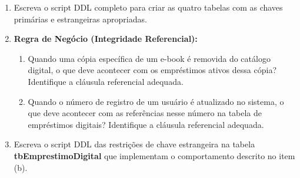 \begin{enumerate}[label=\textbf{\alph*)}]
    \item Escreva o script DDL completo para criar as quatro tabelas com as chaves primárias e estrangeiras apropriadas.
    \resposta{5cm}
    
    \item \textbf{Regra de Negócio (Integridade Referencial):} 
    \begin{enumerate}[label=\arabic*.]
        \item Quando uma cópia específica de um e-book é removida do catálogo digital, o que deve acontecer com os empréstimos ativos dessa cópia? Identifique a cláusula referencial adequada.
        \item Quando o número de registro de um usuário é atualizado no sistema, o que deve acontecer com as referências nesse número na tabela de empréstimos digitais? Identifique a cláusula referencial adequada.
    \end{enumerate}
    \resposta{3cm}
    
    \item Escreva o script DDL das restrições de chave estrangeira na tabela \textbf{tbEmprestimoDigital} que implementam o comportamento descrito no item (b).
    \resposta{3cm}
\end{enumerate}